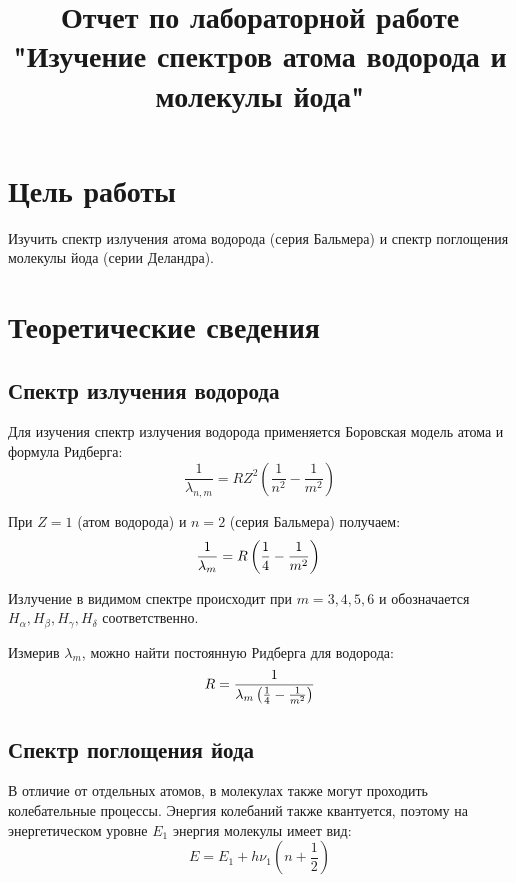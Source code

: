 \documentclass[12pt]{article}
\begin{document}
\title{Отчет по лабораторной работе "Изучение спектров атома водорода и молекулы йода"}
\date{}

\maketitle

\section{Цель работы}
Изучить спектр излучения атома водорода (серия Бальмера) и спектр поглощения молекулы йода (серии Деландра).

\section{Теоретические сведения}
\subsection{Спектр излучения водорода}
Для изучения спектр излучения водорода применяется Боровская модель атома
и формула Ридберга:
\begin{equation*}
    \frac{1}{\lambda_{n,m}} = R Z^2 \left( \frac{1}{n^2} - \frac{1}{m^2} \right)
\end{equation*}

При $Z = 1$ (атом водорода) и $n = 2$ (серия Бальмера) получаем:
\begin{equation*}
    \frac{1}{\lambda_m} = R \left( \frac{1}{4} - \frac{1}{m^2} \right) \\
\end{equation*}

Излучение в видимом спектре происходит при
$m = 3, 4, 5, 6$ и обозначается $H_\alpha, H_\beta, H_\gamma, H_\delta$ соответственно.


Измерив $\lambda_m$, можно найти постоянную Ридберга для водорода:
\begin{equation*}
    R = \frac{1}{\lambda_m \left( \frac{1}{4} - \frac{1}{m^2} \right)} \\
\end{equation*}

\subsection{Спектр поглощения йода}
В отличие от отдельных атомов, в молекулах также могут проходить колебательные процессы.
Энергия колебаний также квантуется, поэтому на энергетическом уровне $E_1$
энергия молекулы имеет вид:
\begin{equation*}
    E = E_1 + h \nu_1 (n + \frac{1}{2})
\end{equation*}
\end{document}
